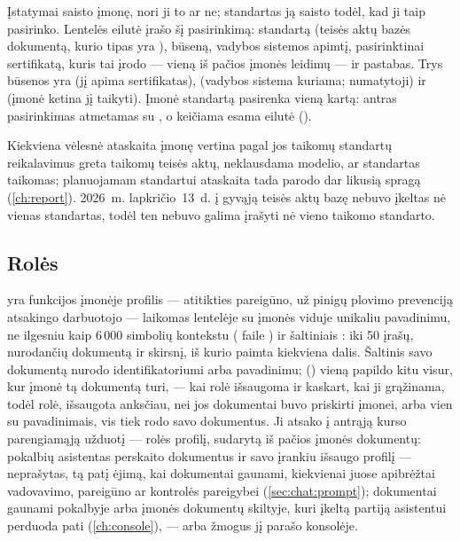 Įstatymai saisto įmonę, nori ji to ar ne; standartas ją saisto todėl, kad ji taip pasirinko.
Lentelės  eilutė įrašo šį pasirinkimą: standartą (teisės aktų bazės
dokumentą, kurio tipas yra ), būseną, vadybos sistemos apimtį, pasirinktinai
sertifikatą, kuris tai įrodo --- vieną iš pačios įmonės leidimų --- ir pastabas. Trys būsenos
yra  (jį apima sertifikatas),  (vadybos sistema kuriama;
numatytoji) ir  (įmonė ketina jį taikyti). Įmonė standartą pasirenka vieną kartą:
antras pasirinkimas atmetamas su , o keičiama esama eilutė
().

Kiekviena vėlesnė ataskaita įmonę vertina pagal jos taikomų standartų reikalavimus greta
taikomų teisės aktų, neklausdama modelio, ar standartas taikomas; planuojamam standartui
ataskaita tada parodo dar likusią spragą (\cref{ch:report}). 2026~m. lapkričio~13~d. į gyvąją
teisės aktų bazę nebuvo įkeltas nė vienas standartas, todėl ten nebuvo galima įrašyti nė vieno
taikomo standarto.

\subsection{Rolės}\label{sec:company:roles}

 yra funkcijos įmonėje profilis --- atitikties pareigūno, už pinigų plovimo
prevenciją atsakingo darbuotojo --- laikomas lentelėje  su įmonės viduje
unikaliu pavadinimu, ne ilgesniu kaip 6\,000 simbolių kontekstu 
( faile ) ir šaltiniais
: iki 50 įrašų, nurodančių dokumentą ir skirsnį, iš kurio paimta kiekviena dalis.
Šaltinis savo dokumentą nurodo identifikatoriumi arba pavadinimu; 
() vieną papildo kitu visur, kur įmonė tą dokumentą turi, ---
kai rolė išsaugoma ir kaskart, kai ji grąžinama, todėl rolė, išsaugota anksčiau, nei jos
dokumentai buvo priskirti įmonei, arba vien su pavadinimais, vis tiek rodo savo dokumentus.
Ji atsako į antrąją kurso parengiamąją užduotį --- rolės profilį, sudarytą iš pačios įmonės
dokumentų: pokalbių asistentas perskaito dokumentus ir savo įrankiu išsaugo profilį --- neprašytas,
tą patį ėjimą, kai dokumentai gaunami, kiekvienai juose apibrėžtai vadovavimo, pareigūno ar
kontrolės pareigybei (\cref{sec:chat:prompt}); dokumentai gaunami pokalbyje arba įmonės
dokumentų skiltyje, kuri įkeltą partiją asistentui perduoda pati (\cref{ch:console}), --- arba
žmogus jį parašo konsolėje.

